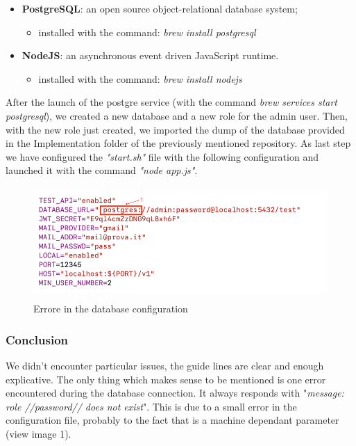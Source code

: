 \documentclass{article}
\begin{document}
	\begin{itemize}
		\item \textbf{PostgreSQL}: an open source object-relational database system;
		\begin{itemize}
			\item	installed with the command: \textit{brew install postgresql}
		\end{itemize}
		\item \textbf{NodeJS}: an asynchronous event driven JavaScript runtime.
		\begin{itemize}
			\item	installed with the command: \textit{brew install nodejs}
		\end{itemize}
	\end{itemize}
	
	After the launch of the postgre service (with the command \textit{brew services start postgresql}), we created a new database and a new role for the admin user. \newline
	Then, with the new role just created, we imported the dump of the database provided in the Implementation folder of the previously mentioned repository.
	As last step we have configured the \textit{"start.sh"} file with the following configuration and launched it with the command \textit{"node app.js"}.
	\begin{figure}[h!]
		\centering
		\includegraphics[height=4.25cm,keepaspectratio]{Figures/error1}
		\caption{Errore in the database configuration}
	\end{figure}
	
\subsubsection{Conclusion}
We didn't encounter particular issues, the guide lines are clear and enough explicative.\newline
The only thing which makes sense to be mentioned is one error encountered during the database connection. It always responds with "\textit{message: role //password// does not exist}". This is due to a small error in the configuration file, probably to the fact that is a machine dependant parameter (view image 1).
\end{document}

